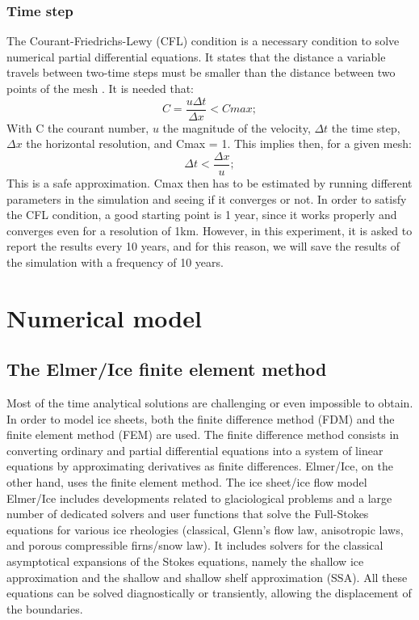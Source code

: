 \documentclass{article}
\begin{document}
\subsubsection{Time step}
The Courant-Friedrichs-Lewy (CFL) condition is a necessary condition to solve numerical partial differential equations. It states that the distance a variable travels between two-time steps must be smaller than the distance between two points of the mesh \cite[]{courant1967partial}. It is needed that:
\begin{equation}
	C=\frac{u\Delta t}{\Delta x}<Cmax;
\end{equation}
With C the courant number, $u$ the magnitude of the velocity, $\Delta t$ the time step, $\Delta x$ the horizontal resolution, and Cmax = 1. This implies then, for a given mesh:
\begin{equation}
	\Delta t < \frac{\Delta x}{u};
\end{equation}
This is a safe approximation. Cmax then has to be estimated by running different parameters in the simulation and seeing if it converges or not. In order to satisfy the CFL condition, a good starting point is 1 year, since it works properly and converges even for a resolution of 1km.
However, in this experiment, it is asked to report the results every 10 years, and for this reason, we will save the results of the simulation with a frequency of 10 years. 

 \section{Numerical model}
 \subsection{The Elmer/Ice finite element method}
 Most of the time analytical solutions are challenging or even impossible to obtain. In order to model ice sheets, both the finite difference method (FDM) and the finite element method (FEM) are used. The finite difference method consists in converting ordinary and partial differential equations into a system of linear equations by approximating derivatives as finite differences. Elmer/Ice, on the other hand, uses the finite element method.
 The ice sheet/ice flow model Elmer/Ice includes developments related to glaciological problems and a large number of dedicated solvers and user functions that solve the Full-Stokes equations for various ice rheologies (classical, Glenn's flow law, anisotropic laws, and porous compressible firns/snow law). It includes solvers for the classical asymptotical expansions of the Stokes equations, namely the shallow ice approximation and the shallow and shallow shelf approximation (SSA). All these equations can be solved diagnostically or transiently, allowing the displacement of the boundaries.
\end{document}
